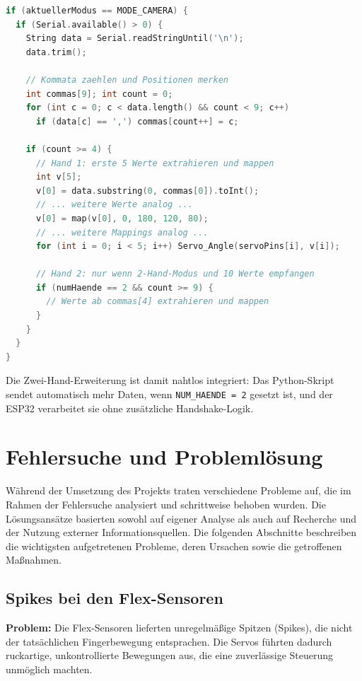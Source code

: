 \documentclass[12pt,a4paper]{article}
\begin{document}
\begin{lstlisting}[language=C++, caption={ESP32: Serielle Daten einlesen und Servos ansteuern}]
if (aktuellerModus == MODE_CAMERA) {
  if (Serial.available() > 0) {
    String data = Serial.readStringUntil('\n');
    data.trim();

    // Kommata zaehlen und Positionen merken
    int commas[9]; int count = 0;
    for (int c = 0; c < data.length() && count < 9; c++)
      if (data[c] == ',') commas[count++] = c;

    if (count >= 4) {
      // Hand 1: erste 5 Werte extrahieren und mappen
      int v[5];
      v[0] = data.substring(0, commas[0]).toInt();
      // ... weitere Werte analog ...
      v[0] = map(v[0], 0, 180, 120, 80);
      // ... weitere Mappings analog ...
      for (int i = 0; i < 5; i++) Servo_Angle(servoPins[i], v[i]);

      // Hand 2: nur wenn 2-Hand-Modus und 10 Werte empfangen
      if (numHaende == 2 && count >= 9) {
        // Werte ab commas[4] extrahieren und mappen
      }
    }
  }
}
\end{lstlisting}

Die Zwei-Hand-Erweiterung ist damit nahtlos integriert: Das Python-Skript sendet automatisch mehr Daten, wenn \texttt{NUM\_HAENDE = 2} gesetzt ist, und der ESP32 verarbeitet sie ohne zusätzliche Handshake-Logik.

\newpage

\section{Fehlersuche und Problemlösung}

Während der Umsetzung des Projekts traten verschiedene Probleme auf, die im Rahmen der Fehlersuche analysiert und schrittweise behoben wurden. Die Lösungsansätze basierten sowohl auf eigener Analyse als auch auf Recherche und der Nutzung externer Informationsquellen. Die folgenden Abschnitte beschreiben die wichtigsten aufgetretenen Probleme, deren Ursachen sowie die getroffenen Maßnahmen.

\subsection{Spikes bei den Flex-Sensoren}

\textbf{Problem:} Die Flex-Sensoren lieferten unregelmäßige Spitzen (Spikes), die nicht der tatsächlichen Fingerbewegung entsprachen. Die Servos führten dadurch ruckartige, unkontrollierte Bewegungen aus, die eine zuverlässige Steuerung unmöglich machten.
\end{document}
